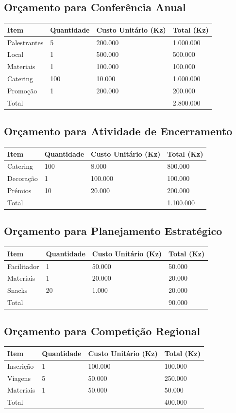 \documentclass[12pt]{article}
\begin{document}
\subsection{Orçamento para Conferência Anual}
\begin{longtable}{|l|l|l|l|}
\hline
Item & Quantidade & Custo Unitário (Kz) & Total (Kz) \\
\hline
Palestrantes & 5 & 200.000 & 1.000.000 \\
Local & 1 & 500.000 & 500.000 \\
Materiais & 1 & 100.000 & 100.000 \\
Catering & 100 & 10.000 & 1.000.000 \\
Promoção & 1 & 200.000 & 200.000 \\
\hline
Total & & & 2.800.000 \\
\hline
\end{longtable}

\subsection{Orçamento para Atividade de Encerramento}
\begin{longtable}{|l|l|l|l|}
\hline
Item & Quantidade & Custo Unitário (Kz) & Total (Kz) \\
\hline
Catering & 100 & 8.000 & 800.000 \\
Decoração & 1 & 100.000 & 100.000 \\
Prémios & 10 & 20.000 & 200.000 \\
\hline
Total & & & 1.100.000 \\
\hline
\end{longtable}

\subsection{Orçamento para Planejamento Estratégico}
\begin{longtable}{|l|l|l|l|}
\hline
Item & Quantidade & Custo Unitário (Kz) & Total (Kz) \\
\hline
Facilitador & 1 & 50.000 & 50.000 \\
Materiais & 1 & 20.000 & 20.000 \\
Snacks & 20 & 1.000 & 20.000 \\
\hline
Total & & & 90.000 \\
\hline
\end{longtable}

\subsection{Orçamento para Competição Regional}
\begin{longtable}{|l|l|l|l|}
\hline
Item & Quantidade & Custo Unitário (Kz) & Total (Kz) \\
\hline
Inscrição & 1 & 100.000 & 100.000 \\
Viagens & 5 & 50.000 & 250.000 \\
Materiais & 1 & 50.000 & 50.000 \\
\hline
Total & & & 400.000 \\
\hline
\end{longtable}
\end{document}
